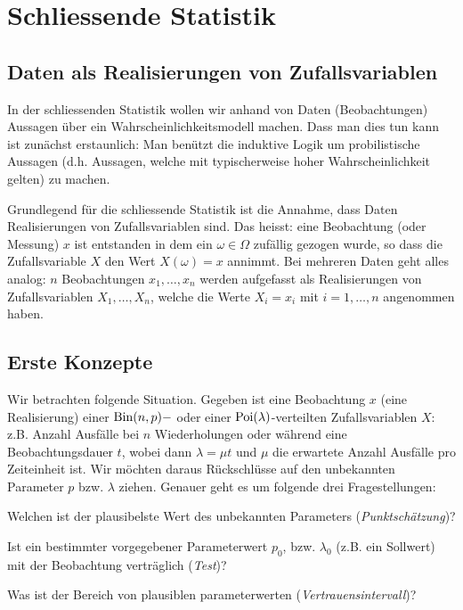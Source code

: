 \chapter{Schliessende Statistik}
\section{Daten als Realisierungen von Zufallsvariablen}
\label{sec8.1}
In der schliessenden Statistik wollen wir anhand von Daten (Beobachtungen) Aussagen über ein Wahrscheinlichkeitsmodell machen. Dass man dies tun kann ist zunächst erstaunlich: Man benützt die induktive Logik um probilistische Aussagen (d.h. Aussagen, welche mit typischerweise hoher Wahrscheinlichkeit gelten)  zu machen.

Grundlegend für die schliessende Statistik ist die Annahme, dass Daten Realisierungen von Zufallsvariablen sind. Das heisst: eine Beobachtung (oder \glqq Messung\grqq) $x$ ist entstanden in dem ein $\omega\in\Omega$ zufällig gezogen wurde, so dass die Zufallsvariable $X$ den Wert $X(\omega)=x$ annimmt. Bei mehreren Daten geht alles analog: $n$ Beobachtungen $x_1,\ldots,x_n$ werden aufgefasst als Realisierungen von Zufallsvariablen $X_1,\ldots,X_n$, welche die Werte $X_i=x_i$ mit $i=1,\ldots,n$  angenommen haben.
\section{Erste Konzepte}
Wir betrachten folgende Situation. Gegeben ist eine Beobachtung $x$ (eine Realisierung) einer $\operatorname{Bin}(n,p)-$ oder einer  $\operatorname{Poi}(\lambda)$-verteilten Zufallsvariablen $X$: z.B. Anzahl Ausfälle bei $n$ Wiederholungen oder während eine Beobachtungsdauer $t$, wobei dann $\lambda=\mu t$ und $\mu$ die erwartete Anzahl Ausfälle pro Zeiteinheit ist. Wir möchten daraus Rückschlüsse auf den unbekannten Parameter $p$ bzw. $\lambda$ ziehen. Genauer geht es um folgende drei Fragestellungen:
\begin{compactenum}[1.]
	\item Welchen ist der plausibelste Wert des unbekannten Parameters (\emph{Punktschätzung})?
	\item Ist ein bestimmter vorgegebener Parameterwert $p_0$, bzw. $\lambda_0$ (z.B. ein Sollwert) mit der Beobachtung verträglich (\emph{Test})?
	\item Was ist der Bereich von plausiblen parameterwerten (\emph{Vertrauensintervall})?
\end{compactenum}
